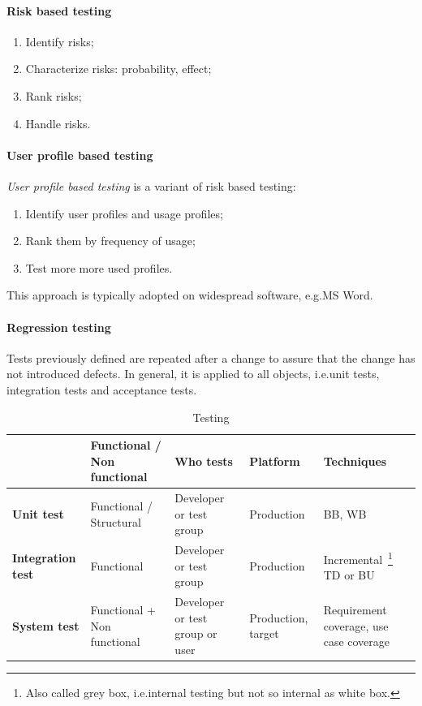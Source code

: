 \paragraph{Risk based testing}
\begin{enumerate}
\item Identify risks;
\item Characterize risks: probability, effect;
\item Rank risks;
\item Handle risks.
\end{enumerate}

\paragraph{User profile based testing}
\emph{User profile based testing} is a variant of risk based testing:
\begin{enumerate}
\item Identify user profiles and usage profiles;
\item Rank them by frequency of usage;
\item Test more more used profiles.
\end{enumerate}
This approach is typically adopted on widespread software, e.g.\@ MS Word.

\paragraph{Regression testing}
Tests previously defined are repeated after a change to assure that the change has not introduced defects. In general, it is applied to all objects, i.e.\@ unit tests, integration tests and acceptance tests.

\begin{table}
\centering
\begin{tabularx}{\textwidth}{|X|X|X|X|X|}
\hline 
 & Functional / Non functional & Who tests & Platform & Techniques \\ 
\hline
\textbf{Unit test} & Functional / Structural & Developer or test group & Production  & BB, WB\\ 
\hline 
\textbf{Integration test} & Functional & Developer or test group & Production & Incremental~\footnote{Also called grey box, i.e.\@ internal testing but not so internal as white box.} TD or BU\\ 
\hline 
\textbf{System test} & Functional + Non functional & Developer or test group or user & Production, target & Requirement coverage, use case coverage \\ 
\hline 
\end{tabularx}
\caption{Testing}
\end{table}

